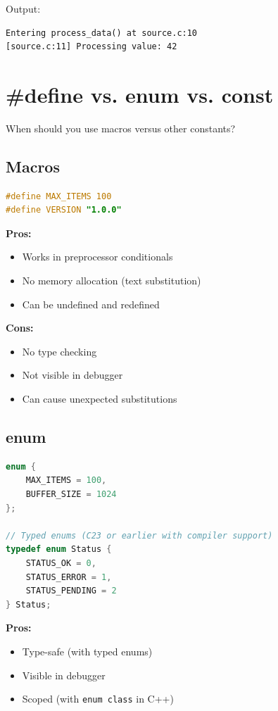 Output:
\begin{verbatim}
Entering process_data() at source.c:10
[source.c:11] Processing value: 42
\end{verbatim}

\section{\#define vs. enum vs. const}

When should you use macros versus other constants?

\subsection{Macros}

\begin{lstlisting}[language=C]
#define MAX_ITEMS 100
#define VERSION "1.0.0"
\end{lstlisting}

\textbf{Pros:}
\begin{itemize}
    \item Works in preprocessor conditionals
    \item No memory allocation (text substitution)
    \item Can be undefined and redefined
\end{itemize}

\textbf{Cons:}
\begin{itemize}
    \item No type checking
    \item Not visible in debugger
    \item Can cause unexpected substitutions
\end{itemize}

\subsection{enum}

\begin{lstlisting}[language=C]
enum {
    MAX_ITEMS = 100,
    BUFFER_SIZE = 1024
};

// Typed enums (C23 or earlier with compiler support)
typedef enum Status {
    STATUS_OK = 0,
    STATUS_ERROR = 1,
    STATUS_PENDING = 2
} Status;
\end{lstlisting}

\textbf{Pros:}
\begin{itemize}
    \item Type-safe (with typed enums)
    \item Visible in debugger
    \item Scoped (with \texttt{enum class} in C++)
\end{itemize}

